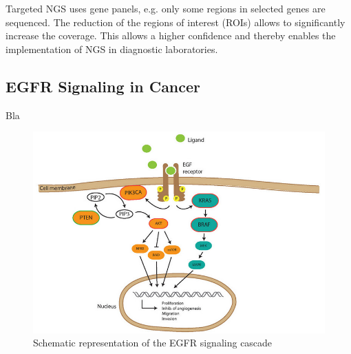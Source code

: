 Targeted NGS uses gene panels, e.g. only some regions in selected genes are
sequenced. The reduction of the regions of interest (ROIs) allows to
significantly increase the coverage. This allows a higher confidence and thereby
enables the implementation of NGS in diagnostic laboratories.

\subsection{EGFR Signaling in Cancer}

Bla {\cite{targeting_egfr:2012}}

\begin{figure}[ht]
  \begin{center}
    \includegraphics[scale=2,angle=0]{egfr_signaling.png}
    \caption{Schematic representation of the EGFR signaling cascade {\cite{targeting_egfr:2012}}}
    \label{Fig:egfr_signaling}
  \end{center}
\end{figure}

